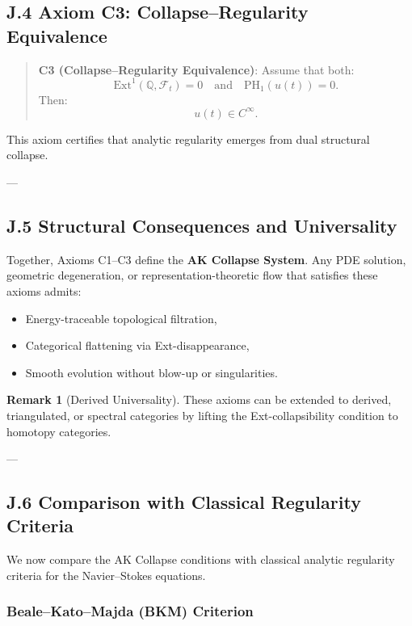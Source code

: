 \documentclass[11pt]{article}
\theoremstyle{definition}
\newtheorem{remark}[theorem]{Remark}
\begin{document}
\subsection*{J.4 Axiom C3: Collapse–Regularity Equivalence}

\begin{quote}
\textbf{C3 (Collapse–Regularity Equivalence)}:  
Assume that both:
\[
\mathrm{Ext}^1(\mathbb{Q}, \mathcal{F}_t) = 0 \quad \text{and} \quad \mathrm{PH}_1(u(t)) = 0.
\]
Then:
\[
u(t) \in C^\infty.
\]
\end{quote}

This axiom certifies that analytic regularity emerges from dual structural collapse.

---

\subsection*{J.5 Structural Consequences and Universality}

Together, Axioms C1–C3 define the \textbf{AK Collapse System}.  
Any PDE solution, geometric degeneration, or representation-theoretic flow that satisfies these axioms admits:
\begin{itemize}
  \item Energy-traceable topological filtration,
  \item Categorical flattening via Ext-disappearance,
  \item Smooth evolution without blow-up or singularities.
\end{itemize}

\begin{remark}[Derived Universality]
These axioms can be extended to derived, triangulated, or spectral categories by lifting the Ext-collapsibility condition to homotopy categories.
\end{remark}

---

\subsection*{J.6 Comparison with Classical Regularity Criteria}

We now compare the AK Collapse conditions with classical analytic regularity criteria for the Navier–Stokes equations.

\subsubsection*{Beale–Kato–Majda (BKM) Criterion}
\end{document}
